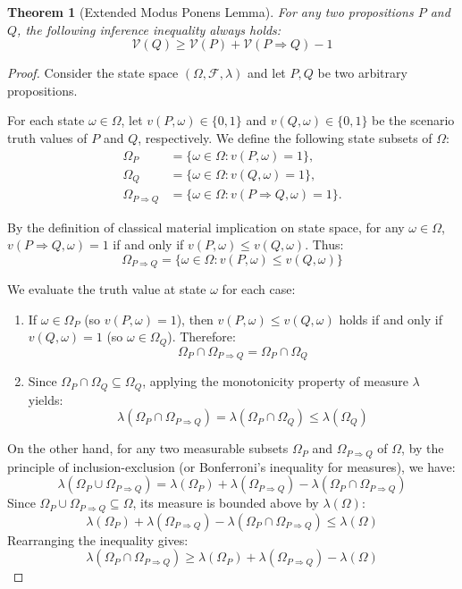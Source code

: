 \documentclass[a4paper,12pt,twoside]{memoir}
\newtheorem{theorem}{Theorem}[chapter]
\newcommand{\ddclmd}{\mathcal{V}} %
\begin{document}
	\begin{theorem}[Extended Modus Ponens Lemma]
		For any two propositions $P$ and $Q$, the following inference inequality always holds:
		\[
		\ddclmd(Q) \ge \ddclmd(P) + \ddclmd(P \Rightarrow Q) - 1
		\]
	\end{theorem}
	\begin{proof}
		Consider the state space $(\Omega, \mathcal{F}, \lambda)$ and let $P, Q$ be two arbitrary propositions.
		
		For each state $\omega \in \Omega$, let $v(P, \omega) \in \{0, 1\}$ and $v(Q, \omega) \in \{0, 1\}$ be the scenario truth values of $P$ and $Q$, respectively. We define the following state subsets of $\Omega$:
		\begin{align*}
			\Omega_P                 & = \{\omega \in \Omega : v(P, \omega) = 1\},                \\
			\Omega_Q                 & = \{\omega \in \Omega : v(Q, \omega) = 1\},                \\
			\Omega_{P \Rightarrow Q} & = \{\omega \in \Omega : v(P \Rightarrow Q, \omega) = 1\}.
		\end{align*}
		
		By the definition of classical material implication on state space, for any $\omega \in \Omega$, $v(P \Rightarrow Q, \omega) = 1$ if and only if $v(P, \omega) \le v(Q, \omega)$. Thus:
		\[
		\Omega_{P \Rightarrow Q} = \{\omega \in \Omega : v(P, \omega) \le v(Q, \omega)\}
		\]
		
		We evaluate the truth value at state $\omega$ for each case:
		\begin{enumerate}[leftmargin=*]
			\item If $\omega \in \Omega_P$ (so $v(P, \omega) = 1$), then $v(P, \omega) \le v(Q, \omega)$ holds if and only if $v(Q, \omega) = 1$ (so $\omega \in \Omega_Q$). Therefore:
			\[
			\Omega_P \cap \Omega_{P \Rightarrow Q} = \Omega_P \cap \Omega_Q
			\]
			\item Since $\Omega_P \cap \Omega_Q \subseteq \Omega_Q$, applying the monotonicity property of measure $\lambda$ yields:
			\[
			\lambda(\Omega_P \cap \Omega_{P \Rightarrow Q}) = \lambda(\Omega_P \cap \Omega_Q) \le \lambda(\Omega_Q)
			\]
		\end{enumerate}
		
		On the other hand, for any two measurable subsets $\Omega_P$ and $\Omega_{P \Rightarrow Q}$ of $\Omega$, by the principle of inclusion-exclusion (or Bonferroni's inequality for measures), we have:
		\[
		\lambda(\Omega_P \cup \Omega_{P \Rightarrow Q}) = \lambda(\Omega_P) + \lambda(\Omega_{P \Rightarrow Q}) - \lambda(\Omega_P \cap \Omega_{P \Rightarrow Q})
		\]
		Since $\Omega_P \cup \Omega_{P \Rightarrow Q} \subseteq \Omega$, its measure is bounded above by $\lambda(\Omega)$:
		\[
		\lambda(\Omega_P) + \lambda(\Omega_{P \Rightarrow Q}) - \lambda(\Omega_P \cap \Omega_{P \Rightarrow Q}) \le \lambda(\Omega)
		\]
		Rearranging the inequality gives:
		\[
		\lambda(\Omega_P \cap \Omega_{P \Rightarrow Q}) \ge \lambda(\Omega_P) + \lambda(\Omega_{P \Rightarrow Q}) - \lambda(\Omega)
		\]
		

\end{proof}
\end{document}
